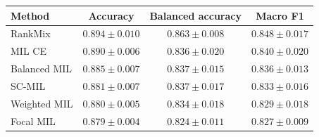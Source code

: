 \begin{tabular}{lccc}
\toprule
Method & Accuracy & Balanced accuracy & Macro F1\\
\midrule
RankMix & $\num{0.894} \pm \num{0.010}$ & $\num{0.863} \pm \num{0.008}$ & $\num{0.848} \pm \num{0.017}$\\
MIL CE & $\num{0.890} \pm \num{0.006}$ & $\num{0.836} \pm \num{0.020}$ & $\num{0.840} \pm \num{0.020}$\\
Balanced MIL & $\num{0.885} \pm \num{0.007}$ & $\num{0.837} \pm \num{0.015}$ & $\num{0.836} \pm \num{0.013}$\\
SC-MIL & $\num{0.881} \pm \num{0.007}$ & $\num{0.837} \pm \num{0.017}$ & $\num{0.833} \pm \num{0.016}$\\
Weighted MIL & $\num{0.880} \pm \num{0.005}$ & $\num{0.834} \pm \num{0.018}$ & $\num{0.829} \pm \num{0.018}$\\
Focal MIL & $\num{0.879} \pm \num{0.004}$ & $\num{0.824} \pm \num{0.011}$ & $\num{0.827} \pm \num{0.009}$\\
\bottomrule
\end{tabular}
